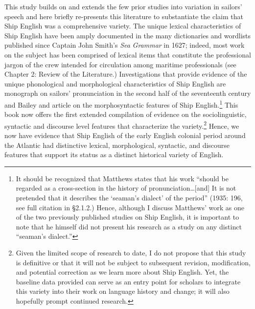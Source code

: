   This study builds on and extends the few prior studies into variation in sailors’ speech and here briefly re-presents this literature to substantiate the claim that Ship English was a comprehensive variety. The unique lexical characteristics of Ship English have been amply documented in the many dictionaries and wordlists published since Captain John Smith’s \textit{Sea} \textit{Grammar} in 1627; indeed, most work on the subject has been comprised of lexical items that constitute the professional jargon of the crew intended for circulation among maritime professionals (see Chapter 2: Review of the Literature.) Investigations that provide evidence of the unique phonological and morphological characteristics of Ship English are  monograph on sailors’ pronunciation in the second half of the seventeenth century and Bailey and  article on the morphosyntactic features of Ship English.\footnote{It should be recognized that Matthews states that his work “should be regarded as a cross-section in the history of pronunciation…[and] It is not pretended that it describes the ‘seaman’s dialect’ of the period” (1935: 196, see full citation in §2.1.2.) Hence, although I discuss Matthews’ work as one of the two previously published studies on Ship English, it is important to note that he himself did not present his research as a study on any distinct “seaman’s dialect.”}  This book now offers the first extended compilation of evidence on the sociolinguistic, syntactic and discourse level features that characterize the variety.\footnote{Given the limited scope of research to date, I do not propose that this study is definitive or that it will not be subject to subsequent revision, modification, and potential correction as we learn more about Ship English. Yet, the baseline data provided can serve as an entry point for scholars to integrate this variety into their work on language history and change; it will also hopefully prompt continued research.}  Hence, we now have evidence that Ship English of the early English colonial period around the Atlantic had distinctive lexical, morphological, syntactic, and discourse features that support its status as a distinct historical variety of English. 

